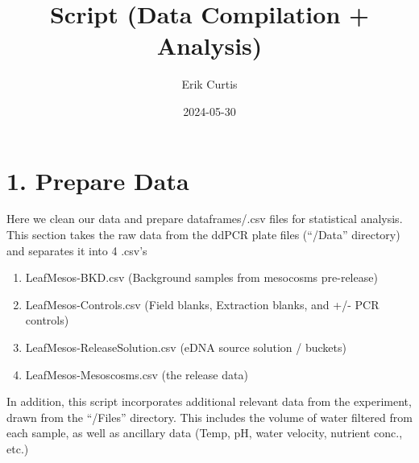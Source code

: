 \documentclass[
]{article}
\title{Script (Data Compilation + Analysis)}
\author{Erik Curtis}
\date{2024-05-30}
\newenvironment{Shaded}{\begin{snugshade}}{\end{snugshade}}
\newcommand{\AttributeTok}[1]{\textcolor[rgb]{0.13,0.29,0.53}{#1}}
\newcommand{\CommentTok}[1]{\textcolor[rgb]{0.56,0.35,0.01}{\textit{#1}}}
\newcommand{\ConstantTok}[1]{\textcolor[rgb]{0.56,0.35,0.01}{#1}}
\newcommand{\FunctionTok}[1]{\textcolor[rgb]{0.13,0.29,0.53}{\textbf{#1}}}
\newcommand{\NormalTok}[1]{#1}
\newcommand{\OtherTok}[1]{\textcolor[rgb]{0.56,0.35,0.01}{#1}}
\newcommand{\SpecialCharTok}[1]{\textcolor[rgb]{0.81,0.36,0.00}{\textbf{#1}}}
\newcommand{\StringTok}[1]{\textcolor[rgb]{0.31,0.60,0.02}{#1}}
\providecommand{\tightlist}{%
  \setlength{\itemsep}{0pt}\setlength{\parskip}{0pt}}
\begin{document}
\maketitle

\section{1. Prepare Data}\label{prepare-data}

Here we clean our data and prepare dataframes/.csv files for statistical
analysis. This section takes the raw data from the ddPCR plate files
(``/Data'' directory) and separates it into 4 .csv's

\begin{enumerate}
\def\labelenumi{\arabic{enumi}.}
\tightlist
\item
  LeafMesos-BKD.csv (Background samples from mesocosms pre-release)
\item
  LeafMesos-Controls.csv (Field blanks, Extraction blanks, and +/- PCR
  controls)
\item
  LeafMesos-ReleaseSolution.csv (eDNA source solution / buckets)
\item
  LeafMesos-Mesoscosms.csv (the release data)
\end{enumerate}

In addition, this script incorporates additional relevant data from the
experiment, drawn from the ``/Files'' directory. This includes the
volume of water filtered from each sample, as well as ancillary data
(Temp, pH, water velocity, nutrient conc., etc.)

\begin{Shaded}
\end{Shaded}
\end{document}
